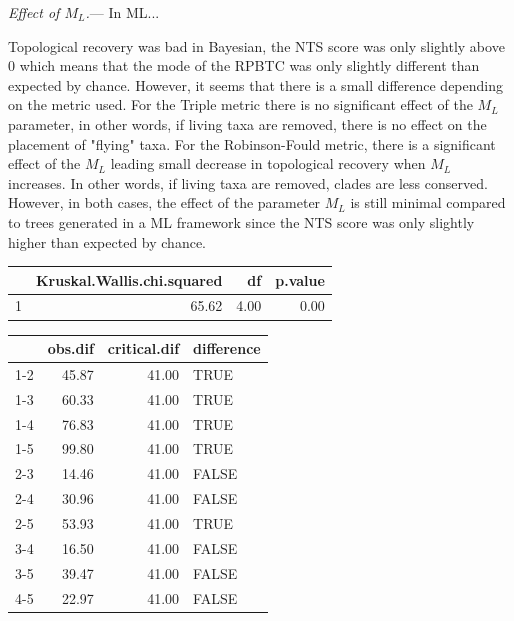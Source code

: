 \documentclass[12pt,letterpaper]{article}
\renewcommand{\subsubsection}[1]{%
\vspace{2ex}
\noindent
\textit{#1.}---}
\begin{document}
\subsubsection{Effect of $M_L$}
In ML...

Topological recovery was bad in Bayesian, the NTS score was only slightly above 0 which means that the mode of the RPBTC was only slightly different than expected by chance.
However, it seems that there is a small difference depending on the metric used.
For the Triple metric there is no significant effect of the $M_L$ parameter, in other words, if living taxa are removed, there is no effect on the placement of "flying" taxa.
For the Robinson-Fould metric, there is a significant effect of the $M_L$ leading small decrease in topological recovery when $M_L$ increases.
In other words, if living taxa are removed, clades are less conserved.
However, in both cases, the effect of the parameter $M_L$ is still minimal compared to trees generated in a ML framework since the NTS score was only slightly higher than expected by chance.





\begin{table}[ht]
\centering
\begin{tabular}{rrrr}
  \hline
 & Kruskal.Wallis.chi.squared & df & p.value \\ 
  \hline
1 & 65.62 & 4.00 & 0.00 \\ 
   \hline
\end{tabular}
\end{table}

\begin{table}[ht]
\centering
\begin{tabular}{rrrl}
  \hline
 & obs.dif & critical.dif & difference \\ 
  \hline
1-2 & 45.87 & 41.00 & TRUE \\ 
  1-3 & 60.33 & 41.00 & TRUE \\ 
  1-4 & 76.83 & 41.00 & TRUE \\ 
  1-5 & 99.80 & 41.00 & TRUE \\ 
  2-3 & 14.46 & 41.00 & FALSE \\ 
  2-4 & 30.96 & 41.00 & FALSE \\ 
  2-5 & 53.93 & 41.00 & TRUE \\ 
  3-4 & 16.50 & 41.00 & FALSE \\ 
  3-5 & 39.47 & 41.00 & FALSE \\ 
  4-5 & 22.97 & 41.00 & FALSE \\ 
   \hline
\end{tabular}
\end{table}
\end{document}
